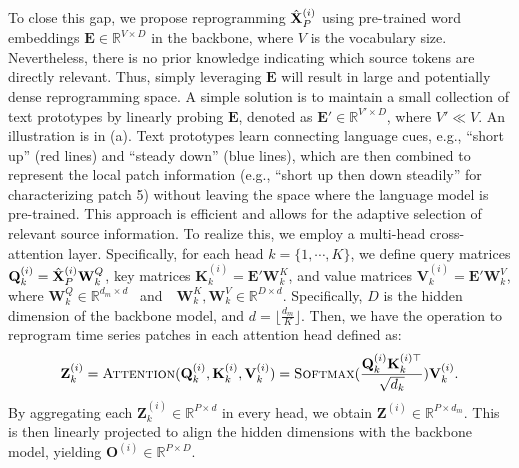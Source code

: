 To close this gap, we propose reprogramming $\Hat{\mathbf{X}}^{(i)}_{P}$ using pre-trained word embeddings $\mathbf{E} \in \mathbb{R}^{V \times D}$ in the backbone, where $V$ is the vocabulary size. Nevertheless, there is no prior knowledge indicating which source tokens are directly relevant. Thus, simply leveraging $\mathbf{E}$ will result in large and potentially dense reprogramming space. A simple solution is to maintain a small collection of text prototypes by linearly probing $\mathbf{E}$, denoted as $\mathbf{E'} \in \mathbb{R}^{V' \times D}$, where $V' \ll V$. An illustration is in (a). Text prototypes learn connecting language cues, e.g., ``short up'' (red lines) and ``steady down'' (blue lines), which are then combined to represent the local patch information (e.g., ``short up then down steadily'' for characterizing patch 5) without leaving the space where the language model is pre-trained. This approach is efficient and allows for the adaptive selection of relevant source information. To realize this, we employ a multi-head cross-attention layer.
Specifically, for each head $k = \{1, \cdots, K\}$, we define query matrices $\mathbf{Q}^{(i)}_k = \Hat{\mathbf{X}}^{(i)}_{P} \mathbf{W}^Q_k$, key matrices $\mathbf{K}^{(i)}_k = \mathbf{E'} \mathbf{W}^K_k$, and value matrices $\mathbf{V}^{(i)}_k = \mathbf{E'} \mathbf{W}^V_k$, where $\mathbf{W}^Q_k \in \mathbb{R}^{d_{m} \times d}$ \ and\ \ $\mathbf{W}^K_k, \mathbf{W}^V_k \in \mathbb{R}^{D \times d}$. Specifically, $D$ is the hidden dimension of the backbone model, and $d=\lfloor\frac{d_{m}}{K}\rfloor$.
Then, we have the operation to reprogram time series patches in each attention head defined as:
\begin{equation}
    \mathbf{Z}^{(i)}_k = \textsc{Attention}(\mathbf{Q}^{(i)}_k, \mathbf{K}^{(i)}_k, \mathbf{V}^{(i)}_k) = \textsc{Softmax}(\frac{\mathbf{Q}^{(i)}_k \mathbf{K}^{(i){\top}}_{k}}{\sqrt{d_k}})\mathbf{V}^{(i)}_k.
\end{equation}
By aggregating each $\mathbf{Z}^{(i)}_k \in \mathbb{R}^{P \times d}$ in every head, we obtain $\mathbf{Z}^{(i)} \in \mathbb{R}^{P \times d_m}$. This is then linearly projected to align the hidden dimensions with the backbone model, yielding $\mathbf{O}^{(i)} \in \mathbb{R}^{P \times D}$.

